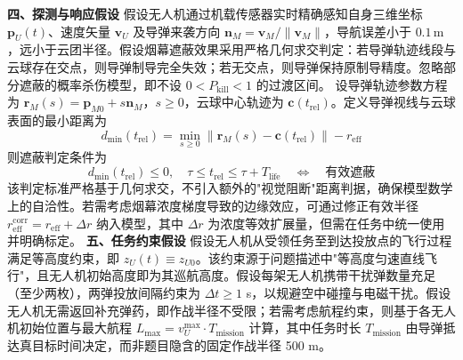 \documentclass{JXUSTmodeling}
\begin{document}
\textbf{四、探测与响应假设}
假设无人机通过机载传感器实时精确感知自身三维坐标 $\mathbf{p}_U(t)$、速度矢量 $\mathbf{v}_U$ 及导弹来袭方向 $\mathbf{n}_M=\mathbf{v}_M/\|\mathbf{v}_M\|$，导航误差小于 $0.1\,\text{m}$，远小于云团半径。假设烟幕遮蔽效果采用严格几何求交判定：若导弹轨迹线段与云球存在交点，则导弹制导完全失效；若无交点，则导弹保持原制导精度。忽略部分遮蔽的概率杀伤模型，即不设 $0<P_{\text{kill}}<1$ 的过渡区间。
设导弹轨迹参数方程为 $\mathbf{r}_M(s)=\mathbf{p}_{M0}+s\mathbf{n}_M$，$s\geq 0$，云球中心轨迹为 $\mathbf{c}(t_{\text{rel}})$。定义导弹视线与云球表面的最小距离为
\begin{equation}
d_{\min}(t_{\text{rel}}) = \min_{s\geq 0} \|\mathbf{r}_M(s) - \mathbf{c}(t_{\text{rel}})\| - r_{\text{eff}} \tag{5}
\end{equation}
则遮蔽判定条件为
\begin{equation}
d_{\min}(t_{\text{rel}}) \leq 0, \quad \tau \leq t_{\text{rel}} \leq \tau + T_{\text{life}} \quad \Leftrightarrow \quad \text{有效遮蔽} \tag{6}
\end{equation}
该判定标准严格基于几何求交，不引入额外的"视觉阻断"距离判据，确保模型数学上的自洽性。若需考虑烟幕浓度梯度导致的边缘效应，可通过修正有效半径 $r_{\text{eff}}^{\text{corr}} = r_{\text{eff}} + \Delta r$ 纳入模型，其中 $\Delta r$ 为浓度等效扩展量，但需在任务中统一使用并明确标定。
\textbf{五、任务约束假设}
假设无人机从受领任务至到达投放点的飞行过程满足等高度约束，即 $z_U(t) \equiv z_{U0}$。该约束源于问题描述中"等高度匀速直线飞行"，且无人机初始高度即为其巡航高度。假设每架无人机携带干扰弹数量充足（至少两枚），两弹投放间隔约束为 $\Delta t \geq 1$ s，以规避空中碰撞与电磁干扰。假设无人机无需返回补充弹药，即作战半径不受限；若需考虑航程约束，则基于各无人机初始位置与最大航程 $L_{\max}=v_U^{\max}\cdot T_{\text{mission}}$ 计算，其中任务时长 $T_{\text{mission}}$ 由导弹抵达真目标时间决定，而非题目隐含的固定作战半径 500 m。
\end{document}
